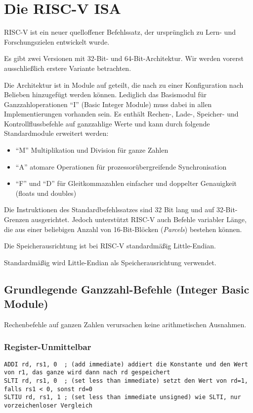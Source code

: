 \section{Die RISC-V ISA}

RISC-V ist ein neuer quelloffener Befehlssatz, der
ursprünglich zu Lern- und Forschungszielen entwickelt wurde.

Es gibt zwei Versionen mit 32-Bit- und 64-Bit-Architektur. Wir werden
vorerst ausschließlich erstere Variante betrachten.

Die Architektur ist in Module auf geteilt, die nach zu einer Konfiguration nach Belieben hinzugefügt werden können.
Lediglich das Basismodul für Ganzzahloperationen ``I'' (Basic Integer Module) muss dabei in allen Implementierungen vorhanden sein.
Es enthält Rechen-, Lade-, Speicher- und Kontrollflussbefehle auf ganzzahlige Werte und kann durch folgende
Standardmodule erweitert werden:

\begin{itemize}
\item ``M'' Multiplikation und Division für ganze Zahlen
\item ``A'' atomare Operationen für prozessorübergreifende Synchronisation
\item ``F'' und ``D'' für Gleitkommazahlen einfacher und doppelter Genauigkeit (floats und doubles)
\end{itemize}

Die Instruktionen des Standardbefehlssatzes sind 32 Bit lang und auf
32-Bit-Grenzen ausgerichtet. Jedoch unterstützt RISC-V auch Befehle variabler Länge, die
aus einer beliebigen Anzahl von 16-Bit-Blöcken (\emph{Parcels}) bestehen können.

Die Speicherausrichtung ist bei RISC-V standardmäßig Little-Endian.

Standardmäßig wird Little-Endian als Speicherausrichtung verwendet.

\subsection{Grundlegende Ganzzahl-Befehle (Integer Basic Module)}

Rechenbefehle auf ganzen Zahlen verursachen keine arithmetischen Ausnahmen.

\subsubsection{Register-Unmittelbar}

\begin{lstlisting}[style=risc-v_Assembler]
ADDI rd, rs1, 0  ; (add immediate) addiert die Konstante und den Wert von r1, das ganze wird dann nach rd gespeichert
SLTI rd, rs1, 0  ; (set less than immediate) setzt den Wert von rd=1, falls rs1 < 0, sonst rd=0
SLTIU rd, rs1, 1 ; (set less than immediate unsigned) wie SLTI, nur vorzeichenloser Vergleich
\end{lstlisting}

